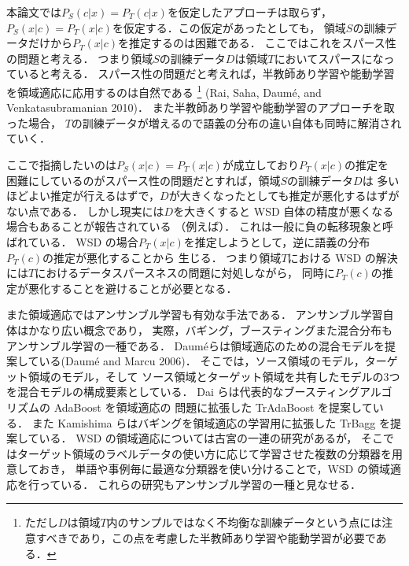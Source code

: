\documentclass[japanese]{jnlp_1.4}
\begin{document}
本論文では\( P_S (c|x) = P_T (c|x)\)を仮定したアプローチは取らず，
\( P_S (x|c) = P_T (x|c)\)を仮定する．この仮定があったとしても，
領域\( S \)の訓練データだけから\( P_T (x|c)\)を推定するのは困難である．
ここではこれをスパース性の問題と考える．
つまり領域\( S \)の訓練データ\( D \)は領域\( T \)においてスパースになっていると考える．
スパース性の問題だと考えれば，半教師あり学習や能動学習を領域適応に応用するのは自然である
\footnote{ただし\( D \)は領域\( T \)内のサンプルではなく不均衡な訓練データという点には注意すべきであり，この点を考慮した半教師あり学習や能動学習が必要である．}
    (Rai, Saha, Daum{\'e}, and Venkatasubramanian 2010)\nocite{rai2010domain}．
また半教師あり学習や能動学習のアプローチを取った場合，
\( T \)の訓練データが増えるので語義の分布の違い自体も同時に解消されていく\cite{chan2007domain}．

ここで指摘したいのは\( P_S (x|c) = P_T (x|c)\)が成立しており\( P_T (x|c)\)の推定を
困難にしているのがスパース性の問題だとすれば，領域\( S \)の訓練データ\( D \)は
多いほどよい推定が行えるはずで，\( D \)が大きくなったとしても推定が悪化するはずがない点である．
しかし現実には\( D \)を大きくすると WSD 自体の精度が悪くなる場合もあることが報告されている
（例えば\cite{komiya-nenji2013}）．
これは一般に負の転移現象\cite{rosenstein2005transfer}と呼ばれている．
WSD の場合\( P_T (x|c)\)を推定しようとして，逆に語義の分布\( P_T (c)\)の推定が悪化することから
生じる．
つまり領域\( T \)における WSD の解決には\( T \)におけるデータスパースネスの問題に対処しながら，
同時に\( P_T (c)\)の推定が悪化することを避けることが必要となる．

また領域適応ではアンサンブル学習も有効な手法である．
アンサンブル学習自体はかなり広い概念であり，
実際，バギング，ブースティングまた混合分布もアンサンブル学習の一種である．
    Daum{\'e}らは領域適応のための混合モデルを提案している(Daum{\'e} and Marcu 2006)\nocite{daume2006domain}．
そこでは，ソース領域のモデル，ターゲット領域のモデル，そして
ソース領域とターゲット領域を共有したモデルの3つを混合モデルの構成要素としている．
Dai らは代表的なブースティングアルゴリズムの AdaBoost を領域適応の
問題に拡張した TrAdaBoost を提案している\cite{Dai2007}．
また Kamishima らはバギングを領域適応の学習用に拡張した TrBagg を提案している\cite{kamishima2009trbagg}．
WSD の領域適応については古宮の一連の研究\cite{komiya2,komiya3,komiya-nlp2012}があるが，
そこではターゲット領域のラベルデータの使い方に応じて学習させた複数の分類器を用意しておき，
単語や事例毎に最適な分類器を使い分けることで，WSD の領域適応を行っている．
これらの研究もアンサンブル学習の一種と見なせる．
\end{document}
